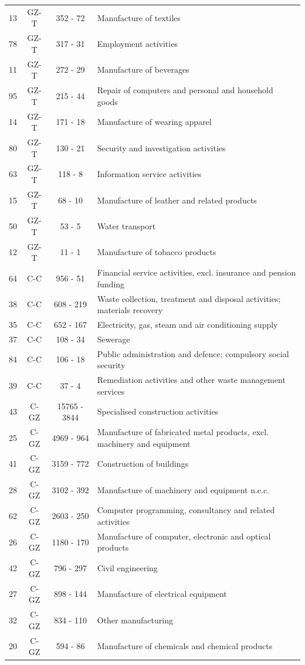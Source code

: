 \begin{table}[htbp]
\begin{threeparttable}
\begin{tabular}{r|c|c|l}
13&	GZ-T&	352 - 72&	Manufacture of textiles\\
78&	GZ-T&	317 - 31&	Employment activities\\
11&	GZ-T&	272 - 29&	Manufacture of beverages\\
95&	GZ-T&	215 - 44&	Repair of computers and personal and household goods\\
14&	GZ-T&	171 - 18&	Manufacture of wearing apparel\\
80&	GZ-T&	130 - 21&	Security and investigation activities\\
63&	GZ-T&	118 - 8&	Information service activities\\
15&	GZ-T&	68 - 10&	Manufacture of leather and related products\\
50&	GZ-T&	53 - 5&	Water transport\\
12&	GZ-T&	11 - 1&	Manufacture of tobacco products\\
\midrule
64&	C-C&	956 - 51&	Financial service activities, excl. insurance and pension funding\\
38&	C-C&	608 - 219&	Waste collection, treatment and disposal activities; materials recovery\\
35&	C-C&	652 - 167&	Electricity, gas, steam and air conditioning supply\\
37&	C-C&	108 - 34&	Sewerage\\
84&	C-C&	106 - 18&	Public administration and defence; compulsory social security\\
39&	C-C&	37 - 4&	Remediation activities and other waste management services\\
\midrule
43&	C-GZ&	15765 - 3844&	Specialised construction activities\\
25&	C-GZ&	4969 - 964&	Manufacture of fabricated metal products, excl. machinery and equipment\\
41&	C-GZ&	3159 - 772&	Construction of buildings\\
28&	C-GZ&	3102 - 392&	Manufacture of machinery and equipment n.e.c.\\
62&	C-GZ&	2603 - 250&	Computer programming, consultancy and related activities\\
26&	C-GZ&	1180 - 170&	Manufacture of computer, electronic and optical products\\
42&	C-GZ&	796 - 297&	Civil engineering\\
27&	C-GZ&	898 - 144&	Manufacture of electrical equipment\\
32&	C-GZ&	834 - 110&	Other manufacturing\\
20&	C-GZ&	594 - 86&	Manufacture of chemicals and chemical products\\

\end{tabular}
\end{threeparttable}
\end{table}
